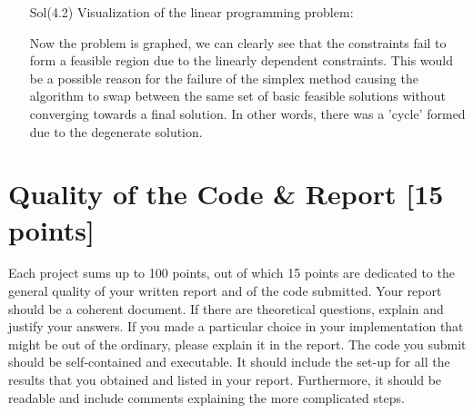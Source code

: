 \documentclass[unicode,11pt,a4paper,oneside,numbers=endperiod,openany]{scrartcl}
\begin{document}
\begin{enumerate}
 \item[Sol(4.2)] Visualization of the linear programming problem:
 \begin{center}
\end{center}
Now the problem is graphed, we can clearly see that the constraints fail to form a feasible region due to the linearly dependent constraints. This would be a possible reason for the failure of the simplex method causing the algorithm to swap between the same set of basic feasible solutions without converging towards a final solution. In other words, there was a 'cycle' formed due to the degenerate solution.
\end{enumerate}


\section{Quality of the Code \& Report [15 points]}

Each project sums up to 100 points, out of which 15 points are dedicated to the general quality of your written report and of the code submitted. Your report should be a coherent document. If there are theoretical questions, explain and justify your answers. If you made a particular choice in your implementation that might be out of the ordinary, please explain it in the report. The code you submit should be self-contained and executable. It should include the set-up for all the results that you obtained and listed in your report. Furthermore, it should be readable and include comments explaining the more complicated steps.
\end{document}
